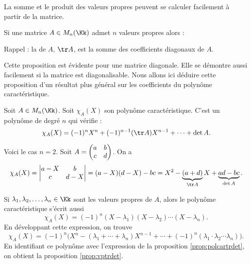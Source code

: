 \documentclass[11pt, class=report,crop=false]{standalone}
\begin{document}
La somme et le produit des valeurs propres peuvent se calculer facilement à partir de la matrice.

\begin{proposition}
\label{prop:vptrdet}
Si une matrice $A \in M_n(\Kk)$ admet $n$ valeurs propres alors :


\end{proposition}

Rappel : la  de $A$, $\tr A$, est la somme des coefficients diagonaux de $A$.


Cette proposition est évidente pour une matrice diagonale. Elle se démontre aussi facilement si la matrice est diagonalisable. Nous allons ici déduire cette proposition 
d'un résultat plus général sur les coefficients du polynôme caractéristique.


\begin{proposition}
\label{prop:polcartrdet}
Soit $A \in M_n(\Kk)$. Soit $\chi_A(X)$ son polynôme caractéristique.
C'est un polynôme de degré $n$ qui vérifie :
$$\chi_A(X)=(-1)^n X^n + (-1)^{n-1}(\tr A)X^{n-1}+\dots+\det A.$$
\end{proposition} 


\begin{exemple}
Voici le cas $n=2$. Soit $A=\left(\begin{matrix}a&b\cr c&d\end{matrix}\right)$.
On a $$\chi_A(X)=\left|\begin{matrix}a-X&b\cr c& d-X\end{matrix}\right|
=(a-X)(d-X)-bc=X^2 -\underbrace{(a+d)}_{\tr A}X+
\underbrace{ad-bc}_{\det A}.$$
\end{exemple}



\begin{exemple}
Si $\lambda_1,\lambda_2,\ldots,\lambda_n \in \Kk$ sont les valeurs propres de $A$, alors le polynôme caractéristique s'écrit aussi
$$\chi_A(X) = (-1)^n (X-\lambda_1)(X-\lambda_2)\cdots(X-\lambda_n).$$
En développant cette expression, on trouve
$$\chi_A(X) = (-1)^n \Big(X^n - (\lambda_1+\cdots+\lambda_n) X^{n-1}+\cdots + (-1)^n(\lambda_1\cdot\lambda_2\cdots\lambda_n)\Big).$$
En identifiant ce polynôme avec l'expression de la proposition \ref{prop:polcartrdet}, on obtient la proposition \ref{prop:vptrdet}.
\end{exemple}
\end{document}
